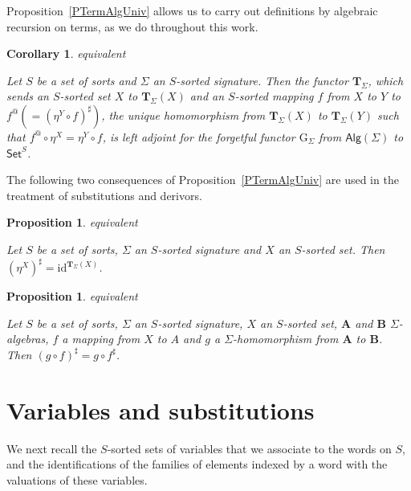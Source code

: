 \documentclass[a4paper, reqno]{amsbook}
\makeatletter
\newcommand{\id}{\mathrm{id}}
\theoremstyle{plain}
\newtheorem{proposition}[theorem]{Proposition}
\newtheorem{corollary}[theorem]{Corollary}
\theoremstyle{definition}
\newcommand*{\CA@leanpending}{}
\newcommand*{\CA@leanrelation}{}
\newcommand*{\lean}[2]{%
  \ifcsname\string\color@lean@#1\endcsname\else
    \PackageError{main}{Unknown relation `#1' in \string\lean}{Use equivalent, weaker or stronger.}%
  \fi
  \gdef\CA@leanrelation{#1}%
  \gdef\CA@leanpending{#2}}
\makeatother
\begin{document}
Proposition~\ref{PTermAlgUniv} allows us to carry out definitions by algebraic recursion on terms, as we do throughout this work.

\begin{corollary}\label{CTermAlgAdj}\lean{equivalent}{Term.adjunction}
Let $S$ be a set of sorts and $\Sigma$ an $S$-sorted signature.
Then the functor $\mathbf{T}_{\Sigma}$, which sends an $S$-sorted set $X$ to $\mathbf{T}_{\Sigma}(X)$ and an $S$-sorted mapping $f$ from $X$ to $Y$ to $f^{@} (= (\eta^{Y}\circ f)^{\sharp})$, the unique homomorphism from $\mathbf{T}_{\Sigma}(X)$ to $\mathbf{T}_{\Sigma}(Y)$ such that $f^{@}\circ\eta^{X} = \eta^{Y}\circ f$, is left adjoint for the forgetful functor $\mathrm{G}_{\Sigma}$ from $\mathsf{Alg}(\Sigma)$ to $\mathsf{Set}^{S}$.
\end{corollary}

The following two consequences of Proposition~\ref{PTermAlgUniv} are used in the treatment of substitutions and derivors.

\begin{proposition}\label{PTermAlgUnivId}\lean{equivalent}{Term.lift_var}
Let $S$ be a set of sorts, $\Sigma$ an $S$-sorted signature and $X$ an $S$-sorted set.
Then $(\eta^{X})^{\sharp} = \id^{\mathbf{T}_{\Sigma}(X)}$.
\end{proposition}

\begin{proposition}\label{PTermAlgUnivComp}\lean{equivalent}{Term.lift_comp}
Let $S$ be a set of sorts, $\Sigma$ an $S$-sorted signature, $X$ an $S$-sorted set, $\mathbf{A}$ and $\mathbf{B}$ $\Sigma$-algebras, $f$ a mapping from $X$ to $A$ and $g$ a $\Sigma$-homomorphism from $\mathbf{A}$ to $\mathbf{B}$.
Then $(g \circ f)^{\sharp} = g \circ f^{\sharp}$.
\end{proposition}

\section{Variables and substitutions}\label{SVariables}

We next recall the $S$-sorted sets of variables that we associate to the words on $S$, and the identifications of the families of elements indexed by a word with the valuations of these variables.
\end{document}
